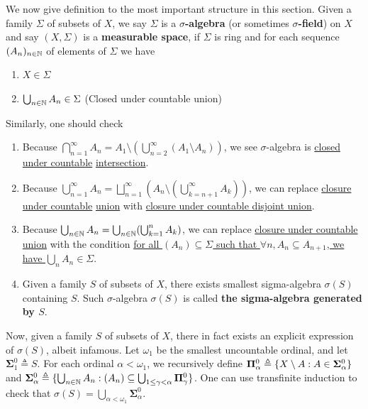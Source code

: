 \documentclass{report}
\begin{document}
\begin{mdframed}
We now give definition to the most important structure in this section. Given a family $\Sigma$ of subsets of $X$,  we say $\Sigma$ is a \textbf{$\sigma$-algebra} (or sometimes \textbf{$\sigma$-field}) on $X$ and say $(X,\Sigma)$ is a \textbf{measurable space}, if $\Sigma$ is ring and for each sequence $(A_n)_{n\in\mathbb{N}}$ of elements of $\Sigma$ we have
\begin{enumerate}[label=(\alph*)]
  \item $X \in \Sigma$
  \item  $\bigcup_{n\in\mathbb{N}} A_n \in \Sigma$ (Closed under countable union)
\end{enumerate}
Similarly, one should check 
\begin{enumerate}[label=(\alph*)]
\label{pop_sig}
\item Because $\bigcap_{n=1}^{\infty}A_n = A_1 \setminus (\bigcup_{n=2}^{\infty}(A_1\setminus A_n))$, we see  $\sigma$-algebra is \underline{closed under countable} \underline{intersection}. 
\item Because $\bigcup_{n=1}^{\infty}A_n = \bigsqcup_{n=1}^{\infty} (A_n \setminus (\bigcup_{k=n+1}^{\infty} A_k))$, we can replace \underline{closure under countable} \underline{union} with \underline{closure under countable disjoint union}.  
\item Because $\bigcup_{n\in\mathbb{N}}A_n = \bigcup_{n\in\mathbb{N}} (\bigcup_{k=1}^n A_k)$, we can replace \underline{closure under countable union} with the condition \underline{for all  $(A_n)\subseteq \Sigma$ such that $\forall n,A_n \subseteq A_{n+1}$, we have $\bigcup_n A_n \in \Sigma$}.
\item Given a family $S$ of subsets of $X$, there exists smallest sigma-algebra $\sigma(S)$ containing $S$. Such $\sigma$-algebra $\sigma(S)$ is called \textbf{the sigma-algebra generated by $S$}.
\end{enumerate}
Now, given a family $S$ of subsets of $X$, there in fact exists an explicit expression of $\sigma (S)$, albeit infamous. Let $\omega_1$ be the smallest uncountable ordinal, and let $\mathbf{\Sigma}^0_1\triangleq S$. For each ordinal $\alpha <\omega_1$, we recursively define $\mathbf{\Pi}^0_\alpha \triangleq  \{ X\setminus A: A \in \mathbf{\Sigma}^0_\alpha \}$ and $\mathbf{\Sigma}^0_\alpha \triangleq \{ \bigcup_{n\in\mathbb{N}}A_n: (A_n)\subseteq \bigcup_{1\leq \gamma <\alpha }\mathbf{\Pi}^0_\gamma  \}$. One can use transfinite induction to check that $\sigma (S)= \bigcup_{\alpha <\omega_1}\mathbf{\Sigma}^0_\alpha$.
\end{mdframed}
\end{document}
